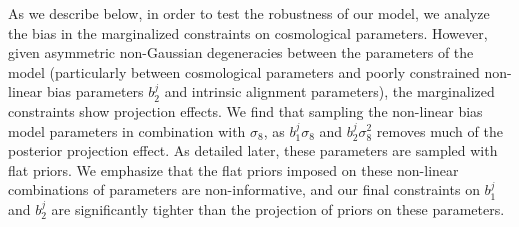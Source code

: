 \documentclass[aps, prd,twocolumn,superscriptaddress,nofootinbib,preprintnumbers]{revtex4-1}
\newcommand{\gammat}{\ensuremath{\gamma_{\rm t}(\theta)}}
\newcommand{\wtheta}{\ensuremath{w(\theta)}}
\newcommand{\red}[1]{\textcolor{red}{#1}}
\begin{document}
\begin{enumerate}
    As we describe below, in order to test the robustness of our model, we analyze the bias in the marginalized constraints on cosmological parameters. However, given asymmetric non-Gaussian degeneracies between the parameters of the model (particularly between cosmological parameters and poorly constrained non-linear bias parameters $b^{j}_2$ and intrinsic alignment parameters), the marginalized constraints show projection effects. We find that sampling the non-linear bias model parameters in combination with $\sigma_8$, as $b^{j}_1 \sigma_8$ and $b^{j}_2 \sigma^2_8$ removes much of the posterior projection effect. As detailed later, these parameters are sampled with flat priors. We emphasize that the flat priors imposed on these non-linear combinations of parameters are non-informative, and our final constraints on $b^{j}_1$ and $b^{j}_2$ are significantly tighter than the projection of priors on these parameters.
\end{enumerate}
\end{document}
